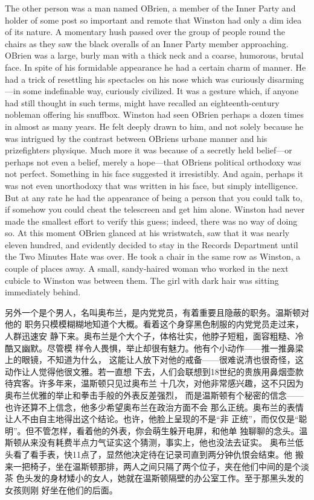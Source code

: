 \begin{paracol}{2}
\switchcolumn*

The other person was a man named O\textquotesingle Brien, a member of
the Inner Party and holder of some post so important and remote that
Winston had only a dim idea of its nature. A momentary hush passed over
the group of people round the chairs as they saw the black overalls of
an Inner Party member approaching. O\textquotesingle Brien was a large,
burly man with a thick neck and a coarse, humorous, brutal face. In
spite of his formidable appearance he had a certain charm of manner. He
had a trick of resettling his spectacles on his nose which was curiously
disarming---in some indefinable way, curiously civilized. It was a
gesture which, if anyone had still thought in such terms, might have
recalled an eighteenth-century nobleman offering his snuffbox. Winston
had seen O\textquotesingle Brien perhaps a dozen times in almost as many
years. He felt deeply drawn to him, and not solely because he was
intrigued by the contrast between
O\textquotesingle Brien\textquotesingle s urbane manner and his
prizefighter\textquotesingle s physique. Much more it was because of a
secretly held belief---or perhaps not even a belief, merely a
hope---that O\textquotesingle Brien\textquotesingle s political
orthodoxy was not perfect. Something in his face suggested it
irresistibly. And again, perhaps it was not even unorthodoxy that was
written in his face, but simply intelligence. But at any rate he had the
appearance of being a person that you could talk to, if somehow you
could cheat the telescreen and get him alone. Winston had never made the
smallest effort to verify this guess; indeed, there was no way of doing
so. At this moment O\textquotesingle Brien glanced at his wristwatch,
saw that it was nearly eleven hundred, and evidently decided to stay in
the Records Department until the Two Minutes Hate was over. He took a
chair in the same row as Winston, a couple of places away. A small,
sandy-haired woman who worked in the next cubicle to Winston was between
them. The girl with dark hair was sitting immediately behind.

\switchcolumn

另外一个是个男人，名叫奥布兰，是内党党员，有着重要且隐蔽的职务。温斯顿对他的
职务只模模糊糊地知道个大概。看着这个身穿黑色制服的内党党员走过来，人群迅速安
静下来。奥布兰是个大个子，体格壮实，他脖子短粗，面容粗糙、冷酷又幽默。尽管模
样令人畏惧，举止却很有魅力。他有个小动作——推一推鼻梁上的眼镜，不知道为什么，
这能让人放下对他的戒备——很难说清也很奇怪，这动作让人觉得他很文雅。若一直想
下去，人们会联想到18世纪的贵族用鼻烟壶款待宾客。许多年来，温斯顿只见过奥布兰
十几次，对他非常感兴趣，这不只因为奥布兰优雅的举止和拳击手般的外表反差强烈，
而是温斯顿有个秘密的信念——也许还算不上信念，他多少希望奥布兰在政治方面不会
那么正统。奥布兰的表情让人不由自主地得出这个结论。也许，他脸上呈现的不是``非
正统''，而仅仅是``聪明''。但不管怎样，看着他的外表，你会萌生躲开电屏，和他单
独聊聊的念头。温斯顿从来没有耗费半点力气证实这个猜测，事实上，他也没法去证实。
奥布兰低头看了看手表，快11点了，显然他决定待在记录司直到两分钟仇恨会结束。他
搬来一把椅子，坐在温斯顿那排，两人之间只隔了两个位子，夹在他们中间的是个淡茶
色头发的身材矮小的女人，她就在温斯顿隔壁的办公室工作。至于那黑头发的女孩则刚
好坐在他们的后面。


\end{paracol}
